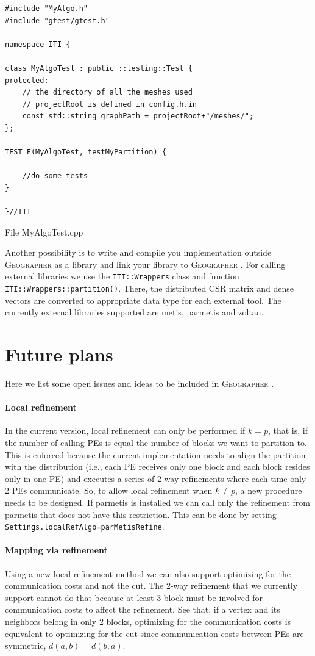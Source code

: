 \documentclass[a4paper,10pt]{article}
\newcommand{\geo}{\textsc{Geographer} }
\newcommand{\MI}[1]{\texttt{#1}}
\begin{document}
\begin{algorithm}
\begin{verbatim}
#include "MyAlgo.h"
#include "gtest/gtest.h"

namespace ITI {

class MyAlgoTest : public ::testing::Test {
protected:
    // the directory of all the meshes used
    // projectRoot is defined in config.h.in
    const std::string graphPath = projectRoot+"/meshes/";
};

TEST_F(MyAlgoTest, testMyPartition) {
	
    //do some tests
}

}//ITI
\end{verbatim}
\caption{File MyAlgoTest.cpp}
\label{MyAlgoTest.cpp}
\end{algorithm}

Another possibility is to write and compile you implementation outside \geo as a library and link
your library to \geo. For calling external libraries we use the \MI{ITI::Wrappers} class and function
\MI{ITI::Wrappers::partition()}. There, the distributed CSR matrix and dense vectors are converted
to appropriate data type for each external tool. The currently external libraries supported are
metis, parmetis and zoltan.


\section{Future plans}

Here we list some open issues and ideas to be included in \geo.

\paragraph*{Local refinement}
In the current version, local refinement can only be performed if $k=p$, that is, if the number 
of calling PEs is equal the number of blocks we want to partition to. 
This is enforced because the current implementation needs to align the partition with the 
distribution (i.e., each PE receives only one block and each block resides only in one PE) 
and executes a series of 2-way refinements
where each time only 2 PEs communicate. So, to allow local refinement when $k\neq p$, a new
procedure needs to be designed.
If parmetis is installed we can call only the refinement from parmetis that does not have 
this restriction. This can be done by setting \MI{Settings.localRefAlgo=parMetisRefine}.

\paragraph*{Mapping via refinement}
Using a new local refinement method we can also support optimizing for the communication
costs and not the cut. The 2-way refinement that we currently support cannot do that because
at least 3 block must be involved for communication costs to affect the refinement. See that, if
a vertex and its neighbors belong in only 2 blocks, optimizing for the communication costs is 
equivalent to optimizing for the cut since communication costs between PEs are symmetric, 
$d(a,b)=d(b,a)$.
\end{document}
